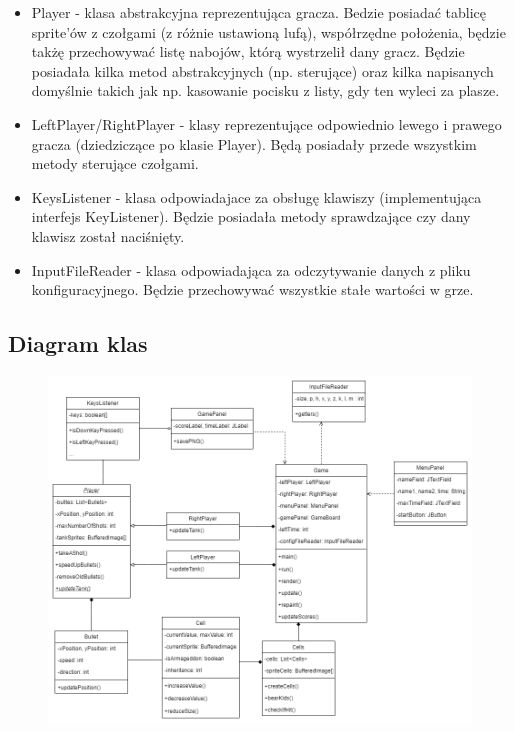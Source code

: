 \documentclass{article}
\begin{document}
\begin{itemize}
\item Player - klasa abstrakcyjna reprezentująca gracza. Bedzie posiadać tablicę sprite'ów z czołgami (z różnie ustawioną lufą), współrzędne położenia, będzie takżę przechowywać listę nabojów, którą wystrzelił dany gracz. Będzie posiadała kilka metod abstrakcyjnych (np. sterujące) oraz kilka napisanych domyślnie takich jak np. kasowanie pocisku z listy, gdy ten wyleci za plasze.

\item LeftPlayer/RightPlayer - klasy reprezentujące odpowiednio lewego i prawego gracza (dziedziczące po klasie Player). Będą posiadały przede wszystkim metody sterujące czołgami. 

\item KeysListener - klasa odpowiadajace za obsługę klawiszy (implementująca interfejs KeyListener). Będzie posiadała metody sprawdzające czy dany klawisz został naciśnięty.

\item InputFileReader - klasa odpowiadająca za odczytywanie danych z pliku konfiguracyjnego. Będzie przechowywać wszystkie stałe wartości w grze.

\end{itemize}
\subsection{Diagram klas}
\begin{figure} [hbt!]
    \centering
    \includegraphics[width=13cm]{DiagramKlas.png}
\end{figure}
\end{document}
